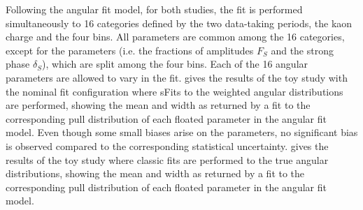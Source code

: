 Following the angular fit model, for both studies, the fit is performed simultaneously to 16 categories defined by the two data-taking periods, the kaon charge and the four \mkpi bins. All parameters are common among the 16 categories, except for the \swave parameters (i.e. the fractions of amplitudes $F_S$ and the strong phase $\delta_S$), which are split among the four \mkpi bins. Each of the 16 \Bs angular parameters are allowed to vary in the fit.  gives the results of the toy study with the nominal fit configuration where sFits to the weighted angular distributions are performed, showing the mean and width as returned by a fit to the corresponding pull distribution of each floated parameter in the \Bs angular fit model. Even though some small biases arise on the \swave parameters, no significant bias is observed compared to the corresponding statistical uncertainty.  gives the results of the toy study where classic fits are performed to the true \Bs angular distributions, showing the mean and width as returned by a fit to the corresponding pull distribution of each floated parameter in the \Bs angular fit model. 
%

